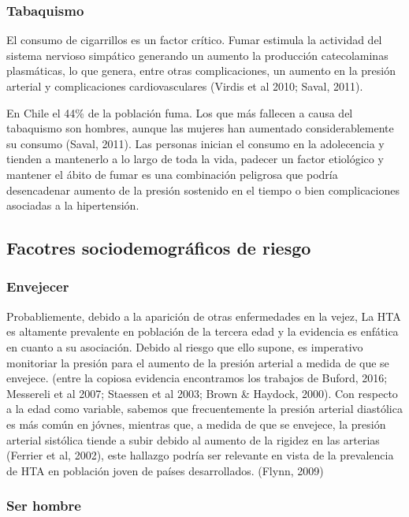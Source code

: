 \documentclass{aa}
\begin{document}
\subsubsection{Tabaquismo}

El consumo de cigarrillos es un factor crítico. Fumar estimula la actividad del sistema nervioso simpático generando un aumento la producción catecolaminas plasmáticas, lo que genera, entre otras complicaciones, un aumento en la presión arterial y complicaciones cardiovasculares (Virdis et al 2010; Saval, 2011).

En Chile el 44\% de la población fuma. Los que más fallecen a causa del tabaquismo son hombres, aunque las mujeres han aumentado considerablemente su consumo (Saval, 2011). Las personas inician el consumo en la adolecencia y tienden a mantenerlo a lo largo de toda la vida, padecer un factor etiológico y mantener el ábito de fumar es una combinación peligrosa que podría desencadenar aumento de la presión sostenido en el tiempo o bien complicaciones asociadas a la hipertensión.


\subsection{Facotres sociodemográficos de riesgo}

\subsubsection{Envejecer}

Probabliemente, debido a la aparición de otras enfermedades en la vejez, La HTA es altamente prevalente en población de la tercera edad y la evidencia es enfática en cuanto a su asociación. Debido al riesgo que ello supone, es imperativo monitoriar la presión para el aumento de la presión arterial a medida de que se envejece. (entre la copiosa evidencia encontramos los trabajos de Buford, 2016; Messereli et al 2007; Staessen et al 2003; Brown \& Haydock, 2000).  Con respecto a la edad como variable, sabemos que frecuentemente la presión arterial diastólica es más común en jóvnes, mientras que, a medida de que se envejece, la presión arterial sistólica tiende a subir debido al aumento de la rigidez en las arterias (Ferrier et al, 2002), este hallazgo podría ser relevante en vista de la prevalencia de HTA en población joven de países desarrollados. (Flynn, 2009)

\subsubsection{Ser hombre}
\end{document}
